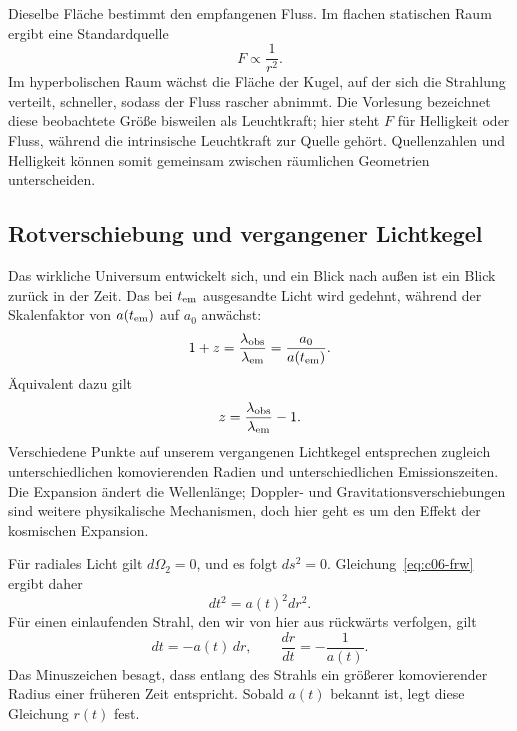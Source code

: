 Dieselbe Fläche bestimmt den empfangenen Fluss. Im flachen statischen Raum ergibt eine Standardquelle
\begin{equation}
F\propto\frac{1}{r^2}.
\end{equation}
Im hyperbolischen Raum wächst die Fläche der Kugel, auf der sich die Strahlung verteilt, schneller, sodass der Fluss rascher abnimmt. Die Vorlesung bezeichnet diese beobachtete Größe bisweilen als Leuchtkraft; hier steht \(F\) für Helligkeit oder Fluss, während die intrinsische Leuchtkraft zur Quelle gehört. Quellenzahlen und Helligkeit können somit gemeinsam zwischen räumlichen Geometrien unterscheiden.

\subsection{Rotverschiebung und vergangener Lichtkegel}

Das wirkliche Universum entwickelt sich, und ein Blick nach außen ist ein Blick zurück in der Zeit. Das bei \(t_{\rm em}\) ausgesandte Licht wird gedehnt, während der Skalenfaktor von \(a(t_{\rm em})\) auf \(a_0\) anwächst:
\begin{equation}
1+z
=\frac{\lambda_{\rm obs}}{\lambda_{\rm em}}
=\frac{a_0}{a(t_{\rm em})}.
\label{eq:c06-redshift}
\end{equation}
Äquivalent dazu gilt
\begin{equation}
z=\frac{\lambda_{\rm obs}}{\lambda_{\rm em}}-1.
\end{equation}
Verschiedene Punkte auf unserem vergangenen Lichtkegel entsprechen zugleich unterschiedlichen komovierenden Radien und unterschiedlichen Emissionszeiten. Die Expansion ändert die Wellenlänge; Doppler- und Gravitationsverschiebungen sind weitere physikalische Mechanismen, doch hier geht es um den Effekt der kosmischen Expansion.

\begin{classroomqa}
\end{classroomqa}

Für radiales Licht gilt \(d\Omega_2=0\), und es folgt \(ds^2=0\). Gleichung~\eqref{eq:c06-frw} ergibt daher
\begin{equation}
dt^2=a(t)^2dr^2.
\end{equation}
Für einen einlaufenden Strahl, den wir von hier aus rückwärts verfolgen, gilt
\begin{equation}
dt=-a(t)\,dr,
\qquad
\frac{dr}{dt}=-\frac{1}{a(t)}.
\label{eq:c06-null-ray}
\end{equation}
Das Minuszeichen besagt, dass entlang des Strahls ein größerer komovierender Radius einer früheren Zeit entspricht. Sobald \(a(t)\) bekannt ist, legt diese Gleichung \(r(t)\) fest.

